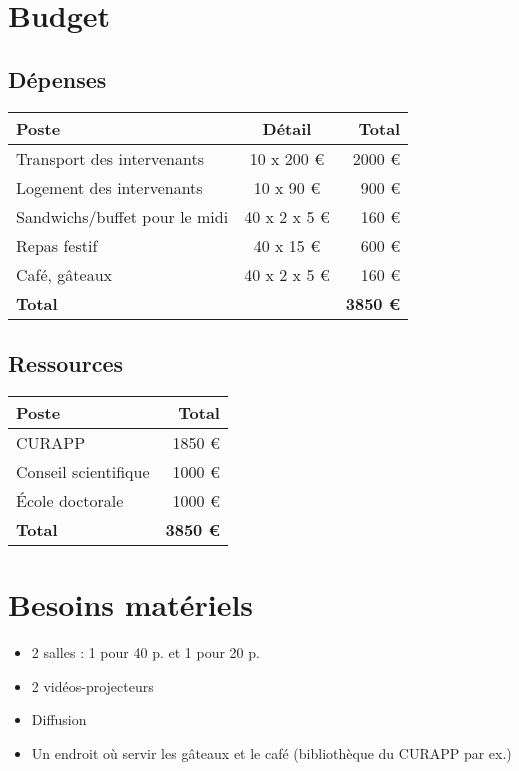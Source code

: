 \documentclass[11pt]{article}
\begin{document}
\section{Budget}

\subsection{Dépenses}

\begin{longtable}{|lcr|}%
\hline
Poste & Détail & Total \\
\hline
\endhead
Transport des intervenants     & 10 x 200 €     & 2000 € \\
Logement des intervenants     & 10 x 90 €        & 900 € \\ %
Sandwichs/buffet pour le midi & 40 x 2 x 5 €    & 160 € \\
Repas festif                                 & 40  x 15 €      & 600 € \\
Café, gâteaux                               & 40 x 2 x 5 €   & 160 € \\
\hline
\textbf{Total}                                &                         & \textbf{3850 €} \\
\hline
\end{longtable}

\subsection{Ressources}

\begin{longtable}{|lr|}
\hline
Poste & Total \\
\hline
\endhead

CURAPP & 1850 € \\
Conseil scientifique & 1000 € \\
École doctorale & 1000 € \\
\hline
\textbf{Total} & \textbf{3850 €} \\
\hline
\end{longtable}


\section{Besoins matériels}
\begin{itemize}
\item 2 salles : 1 pour 40 p. et 1 pour 20 p.
\item 2  vidéos-projecteurs
\item Diffusion
\item Un endroit où servir les gâteaux et le café (bibliothèque du CURAPP par ex.) 
\end{itemize}
\end{document}

